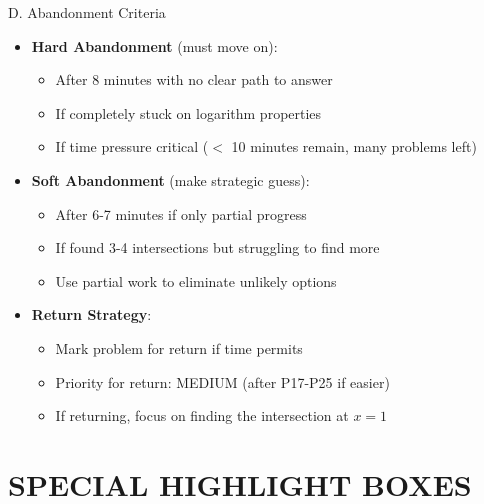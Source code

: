 \documentclass[12pt]{article}
\begin{document}
\begin{competitionbox}{D. Abandonment Criteria}
\begin{itemize}[leftmargin=*]
    \item \textbf{Hard Abandonment} (must move on):
    \begin{itemize}
        \item After 8 minutes with no clear path to answer
        \item If completely stuck on logarithm properties
        \item If time pressure critical ($<$ 10 minutes remain, many problems left)
    \end{itemize}
    
    \item \textbf{Soft Abandonment} (make strategic guess):
    \begin{itemize}
        \item After 6-7 minutes if only partial progress
        \item If found 3-4 intersections but struggling to find more
        \item Use partial work to eliminate unlikely options
    \end{itemize}
    
    \item \textbf{Return Strategy}:
    \begin{itemize}
        \item Mark problem for return if time permits
        \item Priority for return: MEDIUM (after P17-P25 if easier)
        \item If returning, focus on finding the intersection at $x = 1$
    \end{itemize}
\end{itemize}
\end{competitionbox}

\newpage

\section{SPECIAL HIGHLIGHT BOXES}
\end{document}
